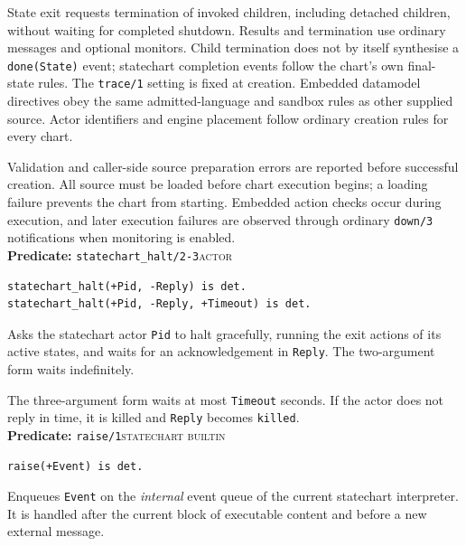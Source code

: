 State exit requests termination of invoked children, including detached
children, without waiting for completed shutdown. Results and termination use
ordinary messages and optional monitors. Child termination does not by itself
synthesise a \texttt{done(State)} event; statechart completion events follow
the chart's own final-state rules. The \texttt{trace/1} setting is fixed at
creation. Embedded datamodel directives obey the same admitted-language and
sandbox rules as other supplied source. Actor identifiers and engine placement
follow ordinary creation rules for every chart.

Validation and caller-side source preparation errors are reported before
successful creation. All source must be loaded before chart execution begins;
a loading failure prevents the chart from starting. Embedded action checks
occur during execution, and later execution failures are observed through
ordinary \texttt{down/\allowbreak{}3} notifications when monitoring is enabled.\\


\noindent \textbf{Predicate:} \texttt{statechart\_\allowbreak{}halt/\allowbreak{}2-3}\hfill\textsc{actor}

\begin{verbatim}
statechart_halt(+Pid, -Reply) is det.
statechart_halt(+Pid, -Reply, +Timeout) is det.
\end{verbatim}

\noindent Asks the statechart actor \texttt{Pid} to halt gracefully, running
the exit actions of its active states, and waits for an acknowledgement in
\texttt{Reply}. The two-argument form waits indefinitely.

The three-argument form waits at most \texttt{Timeout} seconds. If the actor
does not reply in time, it is killed and \texttt{Reply} becomes
\texttt{killed}.\\



\noindent \textbf{Predicate:} \texttt{raise/\allowbreak{}1}\hfill\textsc{statechart builtin}

\begin{verbatim}
raise(+Event) is det.
\end{verbatim}

\noindent Enqueues \texttt{Event} on the \textit{internal} event queue of the
current statechart interpreter. It is handled after the current block of
executable content and before a new external message.\\

